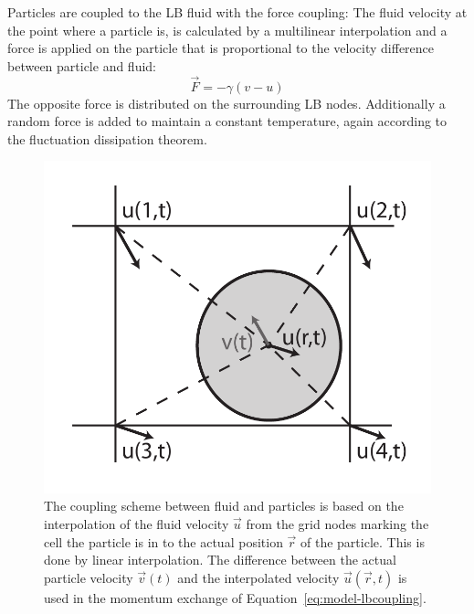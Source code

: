 Particles are coupled to the LB fluid with the force coupling:
The fluid velocity at the point where a particle is, is calculated 
by a multilinear interpolation and a force is applied on the particle
that is proportional to the velocity difference between particle 
and fluid:
\begin{equation}
  \vec{F} = - \gamma \left(v-u\right) 
  \label{eq:model-lbcoupling}
\end{equation}
The opposite force is distributed on the surrounding LB nodes. Additionally
a random force is added to maintain a constant temperature, again according
to the fluctuation dissipation theorem. 
\begin{figure}[htp]
\begin{center}
   \includegraphics[height=0.3\textheight]{../figs/latticeboltzmann-momentumexchange}
   \caption{The coupling scheme between fluid and particles is based on the
   interpolation of the fluid velocity $\vec{u}$ from the grid nodes marking
   the cell the particle is in to the actual position $\vec{r}$ of the
   particle. This is done by linear interpolation. The difference between the
   actual particle velocity $\vec{v}(t)$ and the interpolated velocity
   $\vec{u}(\vec{r},t)$ is used in the momentum exchange of
   Equation~\ref{eq:model-lbcoupling}.}
  \label{fig:model-lbcoupling}
\end{center}
\end{figure}

